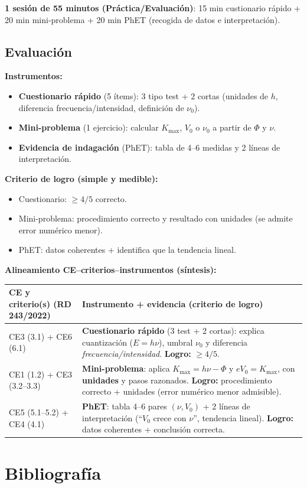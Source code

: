 \documentclass[11pt,a4paper]{article}
\begin{document}
\textbf{1 sesión de 55 minutos (Práctica/Evaluación)}:
15 min custionario rápido + 20 min mini-problema + 20 min PhET (recogida de datos e interpretación).
\subsection*{Evaluación}
\textbf{Instrumentos:}
\begin{itemize}
  \item \textbf{Cuestionario rápido} (5 ítems): 3 tipo test + 2 cortas (unidades de $h$, diferencia frecuencia/intensidad, definición de $\nu_0$).
  \item \textbf{Mini-problema} (1 ejercicio): calcular $K_{\max}$, $V_0$ o $\nu_0$ a partir de $\Phi$ y $\nu$.
  \item \textbf{Evidencia de indagación} (PhET): tabla de 4--6 medidas y 2 líneas de interpretación.
\end{itemize}

\textbf{Criterio de logro (simple y medible):}
\begin{itemize}
  \item Cuestionario: \textbf{$\ge 4/5$} correcto.
  \item Mini-problema: procedimiento correcto y resultado con unidades (se admite error numérico menor).
  \item PhET: datos coherentes + identifica que la tendencia lineal.
\end{itemize}

\textbf{Alineamiento CE--criterios--instrumentos (síntesis):}
\begin{center}
\small
{}
\begin{tabularx}{\linewidth}{L{5.2cm}X}
\toprule
\textbf{CE y criterio(s) (RD 243/2022)} & \textbf{Instrumento + evidencia (criterio de logro)} \\
\midrule
CE3 (3.1) + CE6 (6.1) &
\textbf{Cuestionario rápido} (3 test + 2 cortas): explica cuantización ($E=h\nu$), umbral $\nu_0$ y diferencia
\emph{frecuencia/intensidad}. \textbf{Logro:} $\ge 4/5$. \\

CE1 (1.2) + CE3 (3.2--3.3) &
\textbf{Mini-problema}: aplica $K_{\max}=h\nu-\Phi$ y $eV_0=K_{\max}$, con \textbf{unidades} y pasos razonados.
\textbf{Logro:} procedimiento correcto + unidades (error numérico menor admisible). \\

CE5 (5.1--5.2) + CE4 (4.1) &
\textbf{PhET}: tabla 4--6 pares $(\nu,V_0)$ + 2 líneas de interpretación (“$V_0$ crece con $\nu$”, tendencia lineal).
\textbf{Logro:} datos coherentes + conclusión correcta. \\
\bottomrule
\end{tabularx}
\end{center}
\newpage
\section*{Bibliografía}
\printbibliography[heading=none]
\newpage

\end{document}
